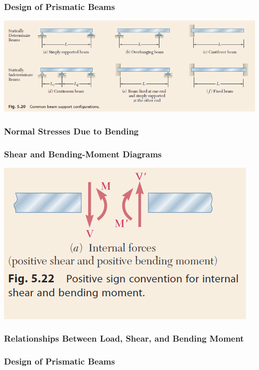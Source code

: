 \documentclass[10pt,landscape]{article}
\newenvironment{Figure}
     {\par\medskip\noindent\minipage{\linewidth}}
     {\endminipage\par\medskip}
\begin{document}
\begin{multicols}{3}
\subsubsection{Design of Prismatic Beams}
\begin{Figure}
    \centering
    \includegraphics[width=\linewidth]{TypesOfBeams.png}
\end{Figure}
\subsubsection{Normal Stresses Due to Bending}
\subsubsection{Shear and Bending-Moment Diagrams}
\begin{Figure}
    \centering
    \includegraphics[width=\linewidth]{F_5_22.png}
\end{Figure}
\subsubsection{Relationships Between Load, Shear, and Bending Moment}
\subsubsection{Design of Prismatic Beams}


%
%

\end{multicols}
\end{document}
